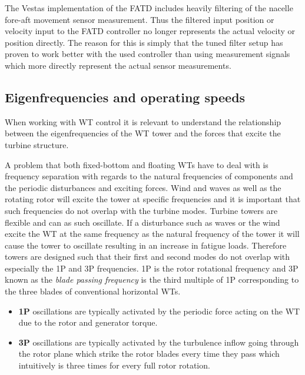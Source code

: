 The Vestas implementation of the FATD includes heavily filtering of the nacelle fore-aft movement sensor measurement. Thus the filtered input position or velocity input to the FATD controller no longer represents the actual velocity or position directly. The reason for this is simply that the tuned filter setup has proven to work better with the used controller than using measurement signals which more directly represent the actual sensor measurements.


\subsection{Eigenfrequencies and operating speeds} \label{sec:eigenfreq}
When working with WT control it is relevant to understand the relationship between the eigenfrequencies of the WT tower and the forces that excite the turbine structure.

A problem that both fixed-bottom and floating WTs have to deal with is frequency separation with regards to the natural frequencies of components and the periodic disturbances and exciting forces. Wind and waves as well as the rotating rotor will excite the tower at specific frequencies and it is important that such frequencies do not overlap with the turbine modes. Turbine towers are flexible and can as such oscillate. If a disturbance such as waves or the wind excite the WT at the same frequency as the natural frequency of the tower it will cause the tower to oscillate resulting in an increase in fatigue loads. Therefore towers are designed such that their first and second modes do not overlap with especially the 1P and 3P frequencies. 1P is the rotor rotational frequency and 3P known as the \textit{blade passing frequency} is the third multiple of 1P corresponding to the three blades of conventional horizontal WTs.
\begin{itemize}
	\item \textbf{1P} oscillations are typically activated by the periodic force acting on the WT due to the rotor and generator torque.
	\item \textbf{3P} oscillations are typically activated by the turbulence inflow going through the rotor plane which strike the rotor blades every time they pass which intuitively is three times for every full rotor rotation.
\end{itemize}

